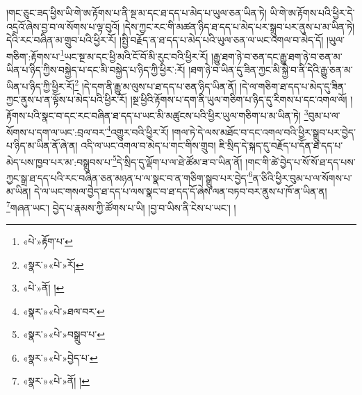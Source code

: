 །གང་ཅུང་ཟད་ཕྱིས་ཡི་གེ་ཨ་རྟོགས་པ་ནི་སྔ་མ་དང་ཐ་དད་པ་མེད་པ་ཡུལ་ཅན་ཡིན་ཏེ། ཡི་གེ་ཨ་རྟོགས་པའི་ཕྱིར་དེ་འདྲའོ་ཞེས་བྱ་བ་ལ་སོགས་པ་ལྟ་བུའོ། །དེས་ཀྱང་རང་གི་མཚན་ཉིད་ཐ་དད་པ་མེད་པར་སྒྲུབ་པར་ནུས་པ་མ་ཡིན་ཏེ། དེའི་རང་བཞིན་མ་གྲུབ་པའི་ཕྱིར་རོ། །སྤྱི་བརྗོད་ན་ཐ་དད་པ་མེད་པའི་ཡུལ་ཅན་ལ་ཡང་འགལ་བ་མེད་དོ། །ཡུལ་གཅིག་:རྟོགས་པ་\footnote{«པེ་»རྟོག་པ་}ཡང་སྔ་མ་དང་ཕྱི་མའི་ངོ་བོ་མི་རུང་བའི་ཕྱིར་རོ། །རྒྱུ་ཐག་ཉེ་བ་ཅན་དང་རྒྱུ་ཐག་ཉེ་བ་ཅན་མ་ཡིན་པ་ཉིད་ཀྱིས་བསྐྱེད་པ་དང་མི་བསྐྱེད་པ་ཉིད་ཀྱི་ཕྱིར་:རོ། །ཐག་ཉེ་བ་ཡིན་དུ་ཟིན་ཀྱང་མི་སྐྱེ་བ་ནི་དེའི་རྒྱུ་ཅན་མ་ཡིན་པ་ཉིད་ཀྱི་ཕྱིར་རོ།\footnote{«སྣར་»«པེ་»རོ།} །དེ་དག་ནི་རྒྱུ་མ་ལུས་པ་ཐ་དད་པ་ཅན་ཉིད་ཡིན་ནོ། །དེ་ལ་གཅིག་ཐ་དད་པ་མེད་དུ་ཟིན་ཀྱང་ནུས་པ་ན་ལྟོས་པ་མེད་པའི་ཕྱིར་རོ། །སྔ་ཕྱིའི་རྟོགས་པ་དག་ནི་ཡུལ་གཅིག་པ་ཉིད་དུ་རིགས་པ་དང་འགལ་ལོ། །རྟོགས་པའི་སྣང་བ་དང་རང་བཞིན་ཐ་དད་པ་ཡང་མི་མཚུངས་པའི་ཕྱིར་ཡུལ་གཅིག་པ་མ་ཡིན་ཏེ། \footnote{«པེ་»ནོ། ། }བུམ་པ་ལ་སོགས་པ་དག་ལ་ཡང་:བྲལ་བར་\footnote{«སྣར་»«པེ་»ཐལ་བར་}འགྱུར་བའི་ཕྱིར་རོ། །གལ་ཏེ་དེ་ལས་མཐོང་བ་དང་འགལ་བའི་ཕྱིར་སྒྲུབ་པར་བྱེད་པ་ཉིད་མ་ཡིན་ནོ་ཞེ་ན། འདི་ལ་ཡང་འགལ་བ་མེད་པ་གང་གིས་གྲུབ། ཇི་སྲིད་དེ་སྐད་དུ་བརྗོད་པ་དོན་ཐ་དད་པ་མེད་པས་ཁྱབ་པར་མ་:བསྒྲུབས་པ་\footnote{«སྣར་»«པེ་»བསྒྲུབ་པ་}དེ་སྲིད་དུ་ལྡོག་པ་ལ་ཐེ་ཚོམ་ཟ་བ་ཡིན་ནོ། །གང་གི་ཚེ་བྱེད་པ་སོ་སོ་ཐ་དད་པས་ཀྱང་སྒྲ་ཐ་དད་པའི་རང་བཞིན་ཅན་མཉན་པ་ལ་སྣང་བ་ན་གཅིག་སྒྲུབ་པར་བྱེད་\footnote{«སྣར་»«པེ་»བྱེད་པ་}ན་ཅིའི་ཕྱིར་བུམ་པ་ལ་སོགས་པ་མ་ཡིན། དེ་ལ་ཡང་གསལ་བྱེད་ཐ་དད་པ་ལས་སྣང་བ་ཐ་དད་དོ་ཞེས་ལན་བཏབ་བར་ནུས་པ་ཁོ་ན་ཡིན་ན། \footnote{«སྣར་»«པེ་»ནོ། ། }གཞན་ཡང་། བྱེད་པ་རྣམས་ཀྱི་ཚོགས་པ་ཡི། །བྱ་བ་ཡིས་ནི་ངེས་པ་ཡང་། །

